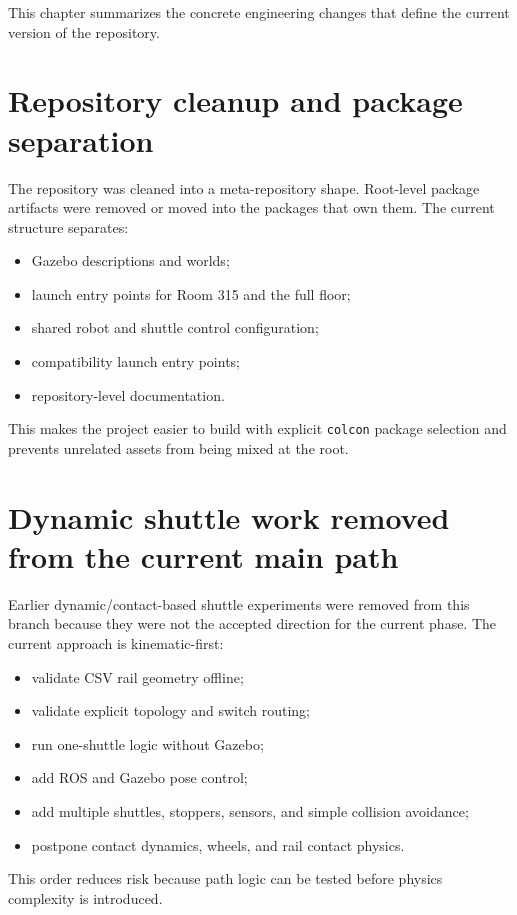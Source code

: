 \documentclass[12pt,a4paper]{report}
\begin{document}
This chapter summarizes the concrete engineering changes that define the
current version of the repository.

\section{Repository cleanup and package separation}

The repository was cleaned into a meta-repository shape. Root-level package
artifacts were removed or moved into the packages that own them. The current
structure separates:

\begin{itemize}
\item Gazebo descriptions and worlds;
\item launch entry points for Room 315 and the full floor;
\item shared robot and shuttle control configuration;
\item compatibility launch entry points;
\item repository-level documentation.
\end{itemize}

This makes the project easier to build with explicit \texttt{colcon} package
selection and prevents unrelated assets from being mixed at the root.

\section{Dynamic shuttle work removed from the current main path}

Earlier dynamic/contact-based shuttle experiments were removed from this branch
because they were not the accepted direction for the current phase. The current
approach is kinematic-first:

\begin{itemize}
\item validate CSV rail geometry offline;
\item validate explicit topology and switch routing;
\item run one-shuttle logic without Gazebo;
\item add ROS and Gazebo pose control;
\item add multiple shuttles, stoppers, sensors, and simple collision avoidance;
\item postpone contact dynamics, wheels, and rail contact physics.
\end{itemize}

This order reduces risk because path logic can be tested before physics
complexity is introduced.
\end{document}
